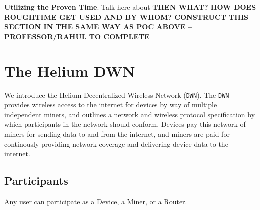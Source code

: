 \documentclass[letterpaper,11pt]{article}
\begin{document}
\textbf{Utilizing the Proven Time}. Talk here about \textbf{THEN WHAT? HOW DOES ROUGHTIME GET USED AND BY WHOM? CONSTRUCT THIS SECTION IN THE SAME WAY AS POC ABOVE -- PROFESSOR/RAHUL TO COMPLETE}

\newpage

\section{The Helium DWN}

We introduce the Helium Decentralized Wireless Network (\verb|DWN|). The \verb|DWN| provides wireless access to the internet for devices by way of multiple independent miners, and outlines a network and wireless protocol specification by which participants in the network should conform. Devices pay this network of miners for sending data to and from the internet, and miners are paid for continously providing network coverage and delivering device data to the internet.

\subsection{Participants}

Any user can participate as a Device, a Miner, or a Router.
\end{document}
